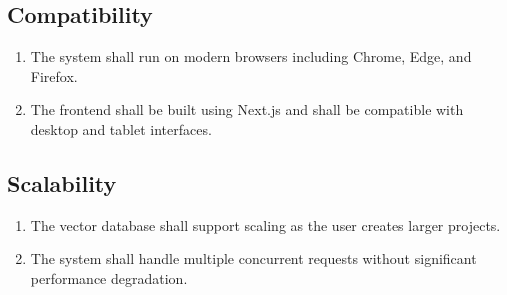 \subsection{Compatibility}
\begin{enumerate}
    \item The system shall run on modern browsers including Chrome, Edge, and Firefox.
    \item The frontend shall be built using Next.js and shall be compatible with desktop and tablet interfaces.
\end{enumerate}

\subsection{Scalability}
\begin{enumerate}
    \item The vector database shall support scaling as the user creates larger projects.
    \item The system shall handle multiple concurrent requests without significant performance degradation.
\end{enumerate}
